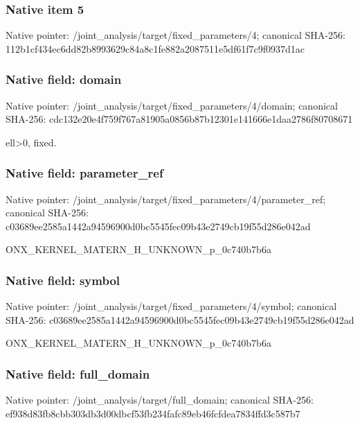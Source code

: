 \documentclass[10pt,a4paper]{article}
\begin{document}
\subsubsection{Native item 5}
Native pointer: /joint\_\allowbreak{}analysis/target/fixed\_\allowbreak{}parameters/4; canonical SHA-256: 112b1cf434ec6dd82b8993629c84a8c1fe882a2087511e5df61f7c9f0937d1ac

\subsubsection{Native field: domain}
Native pointer: /joint\_\allowbreak{}analysis/target/fixed\_\allowbreak{}parameters/4/domain; canonical SHA-256: cdc132e20e4f759f767a81905a0856b87b12301e141666e1daa2786f80708671

\begingroup\raggedright\sloppy ell>0,\allowbreak{} fixed.\par\endgroup

\subsubsection{Native field: parameter\_\allowbreak{}ref}
Native pointer: /joint\_\allowbreak{}analysis/target/fixed\_\allowbreak{}parameters/4/parameter\_\allowbreak{}ref; canonical SHA-256: c03689ee2585a1442a94596900d0bc5545fec09b43e2749cb19f55d286e042ad

\begingroup\raggedright\sloppy ONX\_\allowbreak{}KERNEL\_\allowbreak{}MATERN\_\allowbreak{}H\_\allowbreak{}UNKNOWN\_\allowbreak{}p\_\allowbreak{}0c740b7b6a\par\endgroup

\subsubsection{Native field: symbol}
Native pointer: /joint\_\allowbreak{}analysis/target/fixed\_\allowbreak{}parameters/4/symbol; canonical SHA-256: c03689ee2585a1442a94596900d0bc5545fec09b43e2749cb19f55d286e042ad

\begingroup\raggedright\sloppy ONX\_\allowbreak{}KERNEL\_\allowbreak{}MATERN\_\allowbreak{}H\_\allowbreak{}UNKNOWN\_\allowbreak{}p\_\allowbreak{}0c740b7b6a\par\endgroup

\subsubsection{Native field: full\_\allowbreak{}domain}
Native pointer: /joint\_\allowbreak{}analysis/target/full\_\allowbreak{}domain; canonical SHA-256: ef938d83fb8cbb303db3d00dbcf53fb234fafc89eb46fcfdea7834ffd3c587b7
\end{document}
